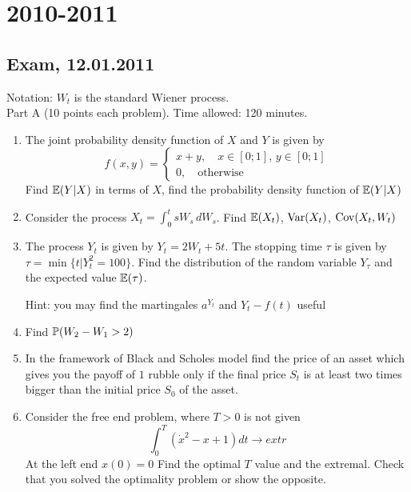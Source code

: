 \documentclass[pdftex,12pt,a4paper]{article}
\begin{document}
\section{2010-2011}

\subsection{Exam, 12.01.2011}

Notation: $W_t$ is the standard Wiener process. \\


Part A (10 points each problem). Time allowed: 120 minutes.  \\

\begin{enumerate}
\item The joint probability density function of $X$ and $Y$ is given by
\begin{equation}
f(x,y)=\begin{cases}
x+y, \quad x\in[0;1],\, y\in [0;1] \\
0, \quad \mbox{otherwise}
\end{cases} \nonumber
\end{equation}
Find $\E(Y|X)$ in terms of $X$, find the probability density function of  $\E(Y|X)$
\item Consider the process $X_t=\int_0^t sW_s\,dW_s$. Find $\E(X_t)$, $\Var(X_t)$, $\Cov(X_t,W_t)$
\item The process $Y_t$ is given by $Y_t=2W_t+5t$. The stopping time $\tau$ is given by $\tau=\min\{t|Y_t^2=100\}$. Find the distribution of the random variable $Y_\tau$ and the expected value $\E(\tau)$.


Hint: you may find the martingales $a^{Y_t}$ and $Y_t-f(t)$ useful
\item Find $\P(W_2-W_1>2)$
\item In the framework of Black and Scholes model find the price of an asset which gives you the payoff of $1$ rubble only if the final price $S_t$ is at least two times bigger than the initial price $S_0$ of the asset. 
\item Consider the free end problem, where $T>0$ is not given
\begin{equation}
\int_0^T (\dot{x}^2-x+1)dt \to extr \nonumber
\end{equation}
At the left end $x(0)=0$
Find the optimal $T$ value and the extremal. Check that you solved the optimality problem or show the opposite.
\end{enumerate}
\end{document}
